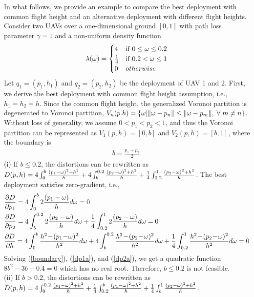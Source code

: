 \documentclass[smallabstract,smallcaptions]{dccpaper}
\newcounter{example}[section]
\begin{document}
In what follows, we provide an example to compare the best deployment with common flight height and an alternative
deployment with different flight heights.  Consider two UAVs over a one-dimensional ground $[0,1]$ with path loss
parameter $\gamma=1$ and a non-uniform density function 
%
\begin{align}
    \lambda(\omega) = 
    \begin{cases}
        4 & \text{if } 0\le\omega\le0.2\\
        \frac{1}{4} & \text{if } 0.2<\omega\le1\\
        0 & otherwise
    \end{cases}
\end{align}
%
Let $q_1=\left(p_1, h_1\right)$ and $q_2=\left(p_2, h_2\right)$ be the deployment of UAV 1 and 2.
First, we derive the best deployment with common flight height assumption, i.e., $h_1=h_2=h$.
Since the common flight height, the generalized Voronoi partition is degenerated to Voronoi partition, $V_n(p. h)=\{\ome|\|\ome-p_n\|\le\|\ome-p_m\|, \forall m\ne n\}$.
Without loss of generality, we assume $0<p_1<p_2<1$, and thus the Voronoi partition can be represented as $V_1(p, h) = [0, b]$ and $V_2(p, h) = [b, 1]$, where the boundary is 
\begin{align}
b = \frac{p_1+p_2}{2}.\label{boundary}
\end{align}
(i) If $b\le0.2$, the distortions can be rewritten as $D(p,h)=4\int_{0}^{b}\frac{(p_1-\omega)^2+h^2}{h}+4\int_{b}^{0.2}\frac{(p_2-\omega)^2+h^2}{h} + \frac{1}{4}\int_{0.2}^{1}\frac{(p_2-\omega)^2+h^2}{h}$. 
The best deployment satisfies zero-gradient, i.e.,
\begin{align}
    &\frac{\partial D}{\partial p_1} = 4\int_{0}^{b}2\frac{(p_1-\ome)}{h}d\ome=0 \label{dp1a}\\
    &\frac{\partial D}{\partial p_2} = 4\int_{b}^{0.2}2\frac{(p_2-\ome)}{h}d\ome
    + \frac{1}{4}\int_{0.2}^{1}2\frac{(p_2-\ome)}{h}d\ome = 0\label{dp2a}\\
    &\frac{\partial D}{\partial h} = 4\int_{0}^{b}\frac{h^2\!-\!(p_1\!-\!\ome)^2}{h^2}d\ome 
    + 4\int_{b}^{0.2}\frac{h^2\!-\!(p_2\!-\!\ome)^2}{h^2}d\ome 
    + \frac{1}{4}\int_{0.2}^1\frac{h^2\!-\!(p_2\!-\!\ome)^2}{h^2}d\ome= 0
\end{align}
Solving (\ref{boundary}), (\ref{dp1a}), and (\ref{dp2a}), we get a quadratic function $8b^2-3b+0.4=0$ which has no real root.
Therefore, $b\le0.2$ is not feasible.\\
(ii) If $b>0.2$, the distortions can be rewritten as
$D(p,h)=4\int_{0}^{0.2}\frac{(p_1-\omega)^2+h^2}{h}+\frac{1}{4}\int_{0.2}^{b}\frac{(p_1-\omega)^2+h^2}{h} + \frac{1}{4}\int_{b}^{1}\frac{(p_2-\omega)^2+h^2}{h}$. 
\end{document}
